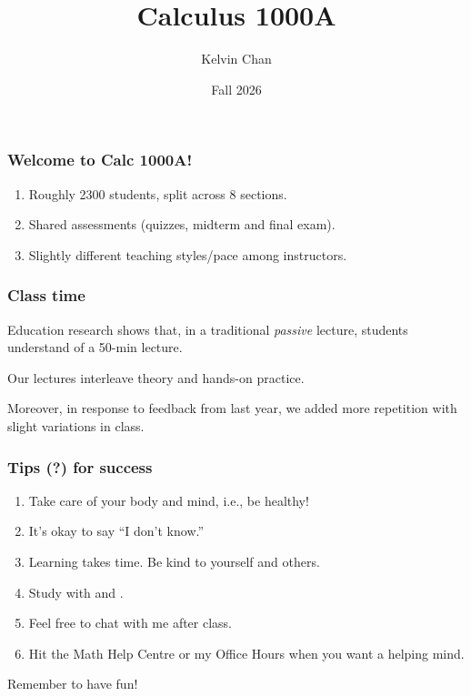 \documentclass[aspectratio=169, 12pt]{beamer}
\title{Calculus 1000A}
\date{Fall 2026}
\author{Kelvin Chan}
\institute{Department of Mathematics\\University of Western Ontario}
\begin{document}
\begin{frame}
  \maketitle{}
\end{frame}

\begin{frame} \frametitle{Welcome to Calc 1000A!}
  \beamerdefaultoverlayspecification{<+->}
  \begin{enumerate}
    \item Roughly 2300 students, split across 8 sections.
    \item Shared assessments (quizzes, midterm and final exam).
    \item Slightly different teaching styles/pace among instructors.
  \end{enumerate}

  \bigskip
\end{frame}

\begin{frame}
  \frametitle{Class time}

  Education research shows that, in a traditional \emph{passive} lecture, students understand  of a 50-min lecture.

  \pause
  Our lectures interleave theory and hands-on practice.

  \pause
  Moreover, in response to feedback from last year, we added more repetition with slight variations in class.
\end{frame}

\begin{frame}
  \centering

  \frametitle{Tips (?) for success}

  \beamerdefaultoverlayspecification{<+->}
  \begin{enumerate}
    \item Take care of your body and mind, i.e., be healthy!
    \item It's okay to say ``I don't know.''
    \item Learning takes time. Be kind to yourself and others.
    \item Study with  and .
    \item Feel free to chat with me after class.
    \item Hit the Math Help Centre or my Office Hours when you want a helping mind.
  \end{enumerate}

  \bigskip
  \pause \Huge
  Remember to have fun!
\end{frame}
\end{document}
